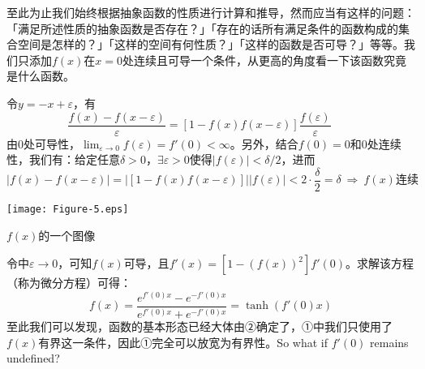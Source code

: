 \begin{kaiti}
	至此为止我们始终根据抽象函数的性质进行计算和推导，然而应当有这样的问题：「满足所述性质的抽象函数是否存在？」「存在的话所有满足条件的函数构成的集合空间是怎样的？」「这样的空间有何性质？」「这样的函数是否可导？」等等。我们只添加$f(x)$在$x=0$处连续且可导一个条件，从更高的角度看一下该函数究竟是什么函数。\par
	令$y=-x+\varepsilon$，有
	\begin{equation}\dfrac{f(x)-f(x-\varepsilon)}{\varepsilon}=[1-f(x)f(x-\varepsilon)]\dfrac{f(\varepsilon)}{\varepsilon}\label{tanh}\qquad\tag{※}\end{equation}
	由$0$处可导性，$\displaystyle\lim_{\varepsilon\rightarrow 0}f(\varepsilon)=f'(0)<\infty$。另外，结合$f(0)=0$和$0$处连续性，我们有：给定任意$\delta>0$，$\exists \varepsilon>0$使得$|f(\varepsilon)|<\delta/2$，进而
	$$|f(x)-f(x-\varepsilon)|=|[1-f(x)f(x-\varepsilon)]||f(\varepsilon)|<2\cdot\dfrac{\delta}{2}=\delta\ \Rightarrow\ f(x)\text{连续}$$
	\begin{marginfigure}
		\texttt{[image: Figure-5.eps]}
		\caption{$f(x)$的一个图像}
	\end{marginfigure}
	令中$\varepsilon\rightarrow 0$，可知$f(x)$可导，且$f'(x)=[1-(f(x))^2]f'(0)$。求解该方程（称为微分方程）可得：$$f(x)=\dfrac{e^{f'(0)x}-e^{-f'(0)x}}{e^{f'(0)x}+e^{-f'(0)x}}=\tanh(f'(0)x)$$		
	至此我们可以发现，函数的基本形态已经大体由②确定了，①中我们只使用了$f(x)$有界这一条件，因此①完全可以放宽为有界性。So what if $f'(0)$ remains undefined?
\end{kaiti}\par\vspace{1em}

